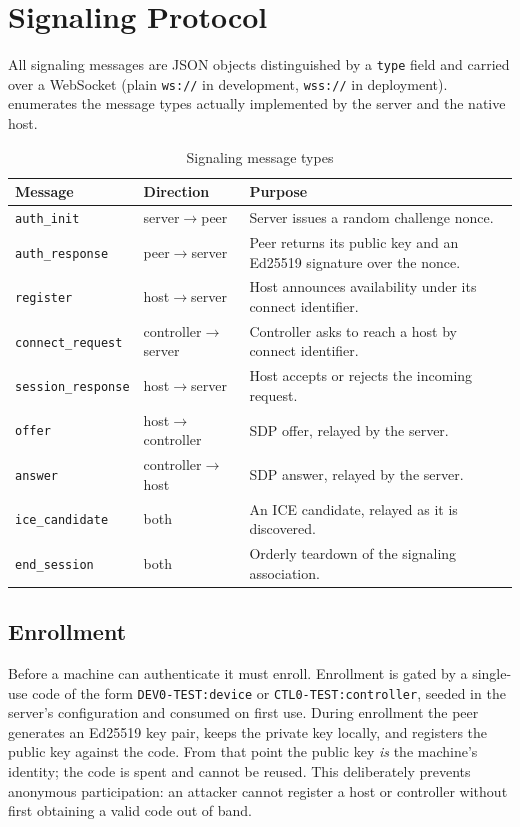 \section{Signaling Protocol}

All signaling messages are JSON objects distinguished by a \texttt{type} field
and carried over a WebSocket (plain \texttt{ws://} in development,
\texttt{wss://} in deployment).  enumerates the message
types actually implemented by the server and the native host.

\begin{table}[H]
\centering
\caption{Signaling message types}
\label{tab:messages}
\small
\begin{tabular}{@{}p{3.2cm}p{2cm}p{7.6cm}@{}}
\toprule
\textbf{Message} & \textbf{Direction} & \textbf{Purpose} \\
\midrule
\texttt{auth\_init}      & server$\to$peer & Server issues a random challenge nonce. \\
\texttt{auth\_response}  & peer$\to$server & Peer returns its public key and an Ed25519 signature over the nonce. \\
\texttt{register}        & host$\to$server & Host announces availability under its connect identifier. \\
\texttt{connect\_request}& controller$\to$server & Controller asks to reach a host by connect identifier. \\
\texttt{session\_response}& host$\to$server & Host accepts or rejects the incoming request. \\
\texttt{offer}           & host$\to$controller & SDP offer, relayed by the server. \\
\texttt{answer}          & controller$\to$host & SDP answer, relayed by the server. \\
\texttt{ice\_candidate}  & both & An ICE candidate, relayed as it is discovered. \\
\texttt{end\_session}    & both & Orderly teardown of the signaling association. \\
\bottomrule
\end{tabular}
\end{table}

\subsection{Enrollment}

Before a machine can authenticate it must enroll. Enrollment is gated by a
single-use code of the form \texttt{DEV0-TEST:device} or
\texttt{CTL0-TEST:controller}, seeded in the server's configuration and consumed
on first use. During enrollment the peer generates an Ed25519 key pair, keeps
the private key locally, and registers the public key against the code. From
that point the public key \emph{is} the machine's identity; the code is spent
and cannot be reused. This deliberately prevents anonymous participation: an
attacker cannot register a host or controller without first obtaining a valid
code out of band.

